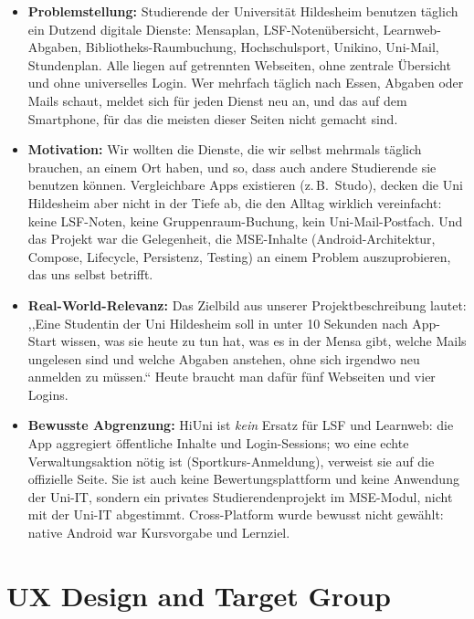 \documentclass{msereport}
\begin{document}
\begin{itemize}
  \item \textbf{Problemstellung:} Studierende der Universität Hildesheim
        benutzen täglich ein Dutzend digitale Dienste: Mensaplan,
        LSF-Notenübersicht, Learnweb-Abgaben, Bibliotheks-Raumbuchung,
        Hochschulsport, Unikino, Uni-Mail, Stundenplan. Alle liegen auf
        getrennten Webseiten, ohne zentrale Übersicht und ohne universelles
        Login. Wer mehrfach täglich nach Essen, Abgaben oder Mails schaut, meldet
        sich für jeden Dienst neu an, und das auf dem Smartphone, für das die
        meisten dieser Seiten nicht gemacht sind.
  \item \textbf{Motivation:} Wir wollten die Dienste, die wir selbst mehrmals
        täglich brauchen, an einem Ort haben, und so, dass auch andere
        Studierende sie benutzen können. Vergleichbare Apps existieren
        (z.\,B.\ Studo), decken die Uni Hildesheim aber nicht in der Tiefe ab,
        die den Alltag wirklich vereinfacht: keine LSF-Noten, keine
        Gruppenraum-Buchung, kein Uni-Mail-Postfach. Und das Projekt war die
        Gelegenheit, die MSE-Inhalte (Android-Architektur, Compose, Lifecycle,
        Persistenz, Testing) an einem Problem auszuprobieren, das uns selbst
        betrifft.
  \item \textbf{Real-World-Relevanz:} Das Zielbild aus unserer
        Projektbeschreibung lautet: ,,Eine Studentin der Uni Hildesheim soll in
        unter 10 Sekunden nach App-Start wissen, was sie heute zu tun hat, was
        es in der Mensa gibt, welche Mails ungelesen sind und welche Abgaben
        anstehen, ohne sich irgendwo neu anmelden zu müssen.`` Heute braucht
        man dafür fünf Webseiten und vier Logins.
  \item \textbf{Bewusste Abgrenzung:} HiUni ist \emph{kein} Ersatz für LSF und
        Learnweb: die App aggregiert öffentliche Inhalte und Login-Sessions; wo
        eine echte Verwaltungsaktion nötig ist (Sportkurs-Anmeldung), verweist
        sie auf die offizielle Seite. Sie ist auch keine Bewertungsplattform und
        keine Anwendung der Uni-IT, sondern ein privates Studierendenprojekt im
        MSE-Modul, nicht mit der Uni-IT abgestimmt. Cross-Platform wurde bewusst
        nicht gewählt: native Android war Kursvorgabe und Lernziel.
\end{itemize}

\msegap

\section{UX Design and Target Group}
\end{document}
